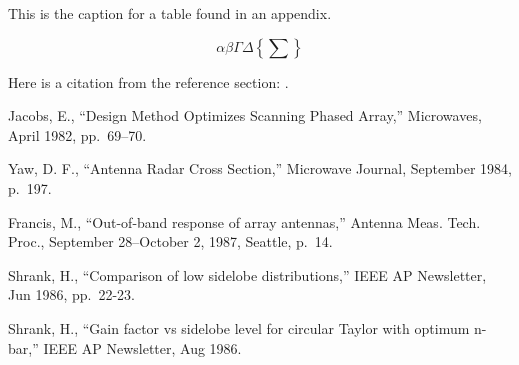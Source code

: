 \begin{table}[h]
\caption{This is the caption for a table found in
an appendix.}
\end{table}

\begin{equation}
\alpha\beta\Gamma\Delta\left\{\sum\right\}\end{equation}

Here is a citation from the reference section: \cite{jacobs}.


\begin{references}
Jacobs, E., ``Design Method Optimizes Scanning
Phased Array,'' Microwaves, April 1982, pp.\ 69--70.

Yaw, D. F., ``Antenna Radar Cross Section,'' Microwave
Journal, September 1984, p.\ 197.

 Francis, M., ``Out-of-band response of array antennas,''
Antenna Meas.  Tech. Proc., September 28--October 2, 1987, Seattle, p.~14.

 Shrank, H., ``Comparison of low sidelobe 
distributions,'' IEEE AP
Newsletter, Jun 1986, pp.~22-23.

 Shrank, H., ``Gain factor vs 
sidelobe level for circular Taylor
with optimum n-bar,'' IEEE AP Newsletter, Aug 1986.
\end{references}




\printindex






